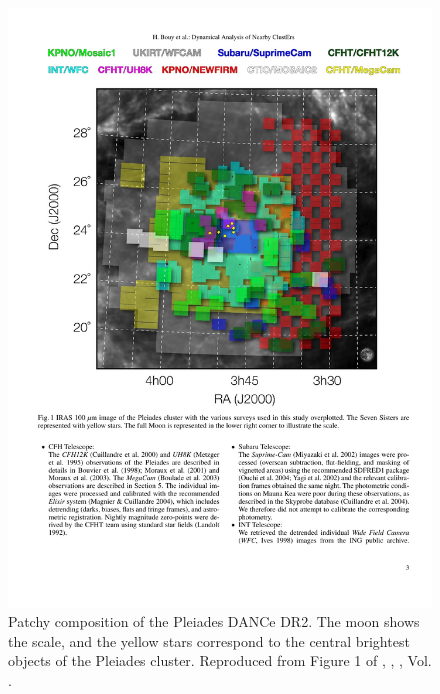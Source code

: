\begin{figure}[ht!]
\begin{center}
\includegraphics[width=\textwidth]{background/Figures/F1_Bouy2013.pdf}
\caption{Patchy composition of the Pleiades DANCe DR2. The moon shows the scale, and the yellow stars correspond to the central brightest objects of the Pleiades cluster. Reproduced from Figure 1 of \citet{Bouy2013}, \textit{}, , Vol. .}
\label{fig:originDANCeDR2}
\end{center}
\end{figure}

